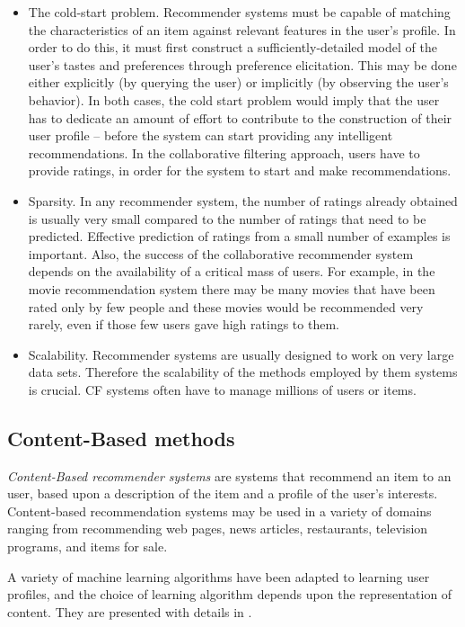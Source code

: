 \documentclass[10pt,a4paper]{article}  %
\begin{document}
\begin{itemize}
  \item The cold-start problem. Recommender systems must be capable of matching the characteristics of an item against relevant features in the user's profile. In order to do this, it must first construct a sufficiently-detailed model of the user's tastes and preferences through preference elicitation. This may be done either explicitly (by querying the user) or implicitly (by observing the user's behavior). In both cases, the cold start problem would imply that the user has to dedicate an amount of effort to contribute to the construction of their user profile – before the system can start providing any intelligent recommendations.
  In the collaborative filtering approach, users have to provide ratings, in order for the system to start and make recommendations.
  \item Sparsity. In any recommender system, the number of ratings already obtained is usually very small compared to the number of ratings that need to be predicted. Effective prediction of ratings from a small number of examples is important. Also, the success of the collaborative recommender system depends on the availability of a critical mass of users. For example, in the movie recommendation system there may be many movies that have been rated only by few people and these movies would be recommended very rarely, even if those few users gave high ratings to them.
  \item Scalability. Recommender systems are usually designed to work on very large data sets. Therefore the scalability of the methods employed by them systems is crucial. CF systems often have to manage millions of users or items.
\end{itemize}
 

\subsection{Content-Based methods}
\label{content_based_methods}
\emph{Content-Based recommender systems} are systems that recommend an item to an user, based upon a description of the item and a profile of the user's interests. Content-based recommendation systems may be used in a variety of domains ranging from recommending web pages, news articles, restaurants, television programs, and items for sale.

A variety of machine learning algorithms have been adapted to learning user profiles, and the choice of learning algorithm depends upon the representation of content. They are presented with details in \cite{content_based_reco_syst}.
\end{document}
